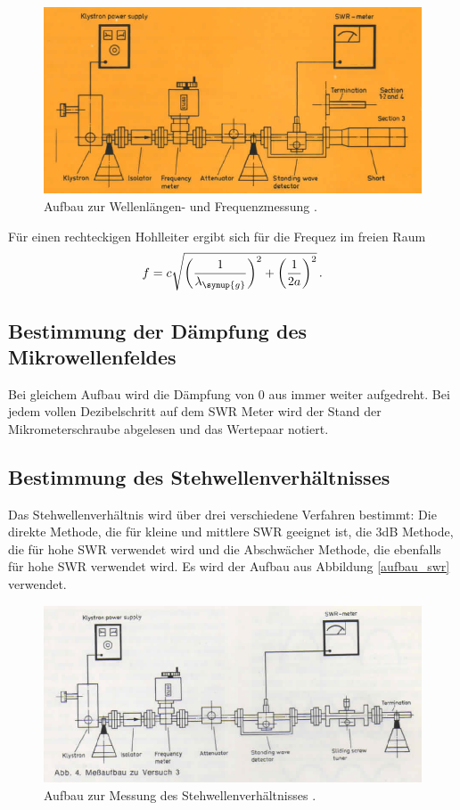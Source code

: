 \begin{figure}
  \centering
  \includegraphics[width=\textwidth]{data/aufbau_frequenz.png}
  \caption{Aufbau zur Wellenlängen- und Frequenzmessung \cite{Versuchsanleitung_alt}.}
  \label{fig:aufbau_frequenz}
\end{figure}

Für einen rechteckigen Hohlleiter ergibt sich für die Frequez im freien Raum
\begin{equation}
  f=c \sqrt{\left(\frac{1}{\lambda_{\symup{g}}}\right)^2+\left(\frac{1}{2a}\right)^2} \,.
\end{equation}

\subsection{Bestimmung der Dämpfung des Mikrowellenfeldes}
\label{subsec:dämpfung}
Bei gleichem Aufbau wird die Dämpfung von 0 aus immer weiter aufgedreht. Bei jedem
vollen Dezibelschritt auf dem SWR Meter wird der Stand der Mikrometerschraube
abgelesen und das Wertepaar notiert.


\subsection{Bestimmung des Stehwellenverhältnisses}
\label{subsec:swr}

Das Stehwellenverhältnis wird über drei verschiedene Verfahren bestimmt: Die direkte
Methode, die für kleine und mittlere SWR geeignet ist, die 3dB Methode, die für hohe
SWR verwendet wird und die Abschwächer Methode, die ebenfalls für hohe SWR verwendet
wird. Es wird der Aufbau aus Abbildung \ref{aufbau_swr} verwendet.

\begin{figure}
  \centering
  \includegraphics[width=\textwidth]{data/aufbau_swr.png}
  \caption{Aufbau zur Messung des Stehwellenverhältnisses \cite{Versuchsanleitung_alt}.}
  \label{fig:aufbau_swr}
\end{figure}


